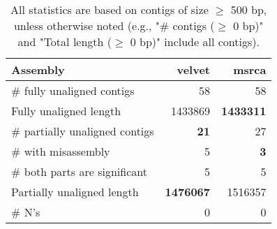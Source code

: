 \documentclass[12pt,a4paper]{article}
\begin{document}
\begin{table}[ht]
\begin{center}
\caption{All statistics are based on contigs of size $\geq$ 500 bp, unless otherwise noted (e.g., "\# contigs ($\geq$ 0 bp)" and "Total length ($\geq$ 0 bp)" include all contigs).}
\begin{tabular}{|l*{2}{|r}|}
\hline
Assembly & velvet & msrca \\ \hline
\# fully unaligned contigs & 58 & 58 \\ \hline
Fully unaligned length & 1433869 & {\bf 1433311} \\ \hline
\# partially unaligned contigs & {\bf 21} & 27 \\ \hline
\hspace{5mm}\# with misassembly & 5 & {\bf 3} \\ \hline
\hspace{5mm}\# both parts are significant & 5 & 5 \\ \hline
Partially unaligned length & {\bf 1476067} & 1516357 \\ \hline
\# N's & 0 & 0 \\ \hline
\end{tabular}
\end{center}
\end{table}
\end{document}
